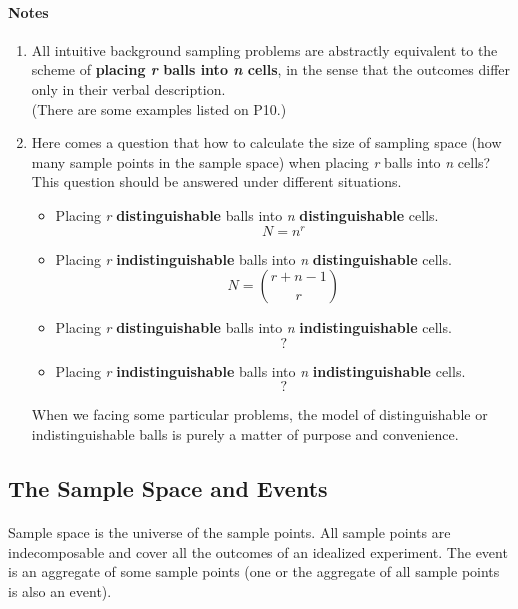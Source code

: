 \documentclass{article}
\numberwithin{equation}{subsection}
\begin{document}
			\paragraph{Notes} 
			\begin{enumerate} 
			\item All intuitive background sampling problems are abstractly equivalent to the scheme of \textbf{placing \textit{r} balls into \textit{n} cells}, in the sense that the outcomes differ only in their verbal description. \\(There are some examples listed on P10.)
			\item Here comes a question that how to calculate the size of sampling space (how many sample points in the sample space) when placing \textit{r} balls into \textit{n} cells? This question should be answered under different situations.
				\begin{itemize}
				\item Placing \textit{r} \textbf{distinguishable} balls into \textit{n} \textbf{distinguishable} cells. \\ $$N=n^r$$
				\item Placing \textit{r} \textbf{indistinguishable} balls into \textit{n} \textbf{distinguishable} cells. \\ $$N= {r+n-1 \choose r}$$
				\item Placing \textit{r} \textbf{distinguishable} balls into \textit{n} \textbf{indistinguishable} cells. \\ $$?$$
				\item Placing \textit{r} \textbf{indistinguishable} balls into \textit{n} \textbf{indistinguishable} cells. \\ $$?$$
				\end{itemize}
			When we facing some particular problems, the model of distinguishable or indistinguishable balls is purely a matter of purpose and convenience.
			\end{enumerate}
		\subsection{The Sample Space and Events} 
			\paragraph{} Sample space is the universe of the sample points. All sample points are indecomposable and cover all the outcomes of an idealized experiment. The event is an aggregate of some sample points (one or the aggregate of all sample points is also an event).
\end{document}
